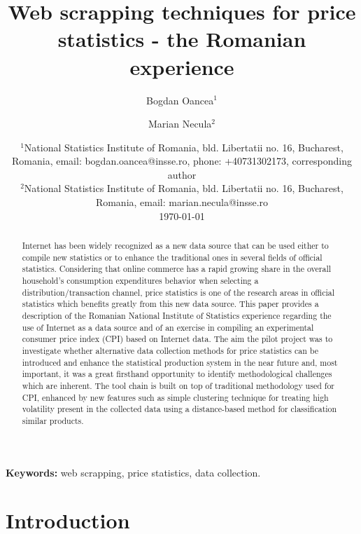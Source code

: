 \documentclass[]{article}
\title{Web scrapping techniques for price statistics -  the Romanian experience}
\author{Bogdan Oancea$^1$ \and Marian Necula$^2$}
\date{%
	$^1$National Statistics Institute of Romania, bld. Libertatii no. 16, Bucharest, Romania, email: bogdan.oancea@insse.ro, phone: +40731302173, corresponding author\\%
	$^2$National Statistics Institute of Romania, bld. Libertatii no. 16, Bucharest, Romania, email: marian.necula@insse.ro\\[2ex]%
	\today
}
\begin{document}
\maketitle

\begin{abstract}
Internet has been widely recognized as a new data source that can be used either to compile new statistics or to enhance the 
traditional ones in several fields of official statistics. Considering that online commerce has a rapid growing share in the 
overall household’s consumption expenditures behavior when selecting a distribution/transaction channel, price statistics is 
one of the research areas in official statistics which benefits greatly from this new data source. 
This paper provides a description of the Romanian National Institute of Statistics experience regarding the use of Internet 
as a data source and of an exercise in compiling an experimental consumer price index (CPI) based on Internet data. The aim the pilot project was to 
investigate whether alternative data collection methods for price statistics can be introduced and enhance the statistical 
production system in the near future and, most important, it was a great firsthand opportunity to identify methodological 
challenges which are inherent.  The tool chain is built on top of traditional methodology used for CPI, enhanced by new features such as simple clustering 
technique for treating high volatility present in the collected data using a distance-based method for classification similar products.

\end{abstract}

{\bf Keywords:} web scrapping, price statistics, data collection.

\section{Introduction}
\end{document}
